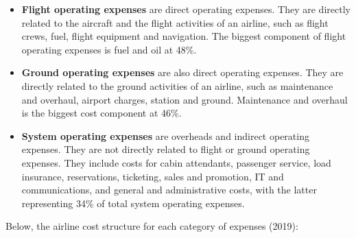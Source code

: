 \documentclass[
  11pt,
  a4paper,
]{book}
\begin{document}
\begin{itemize}
\item
  \textbf{Flight operating expenses} are direct operating expenses. They
  are directly related to the aircraft and the flight activities of an
  airline, such as flight crews, fuel, flight equipment and navigation.
  The biggest component of flight operating expenses is fuel and oil at
  48\%.
\item
  \textbf{Ground operating expenses} are also direct operating expenses.
  They are directly related to the ground activities of an airline, such
  as maintenance and overhaul, airport charges, station and ground.
  Maintenance and overhaul is the biggest cost component at 46\%.
\item
  \textbf{System operating expenses} are overheads and indirect
  operating expenses. They are not directly related to flight or ground
  operating expenses. They include costs for cabin attendants, passenger
  service, load insurance, reservations, ticketing, sales and promotion,
  IT and communications, and general and administrative costs, with the
  latter representing 34\% of total system operating expenses.
\end{itemize}

Below, the airline cost structure for each category of expenses (2019):
\end{document}
